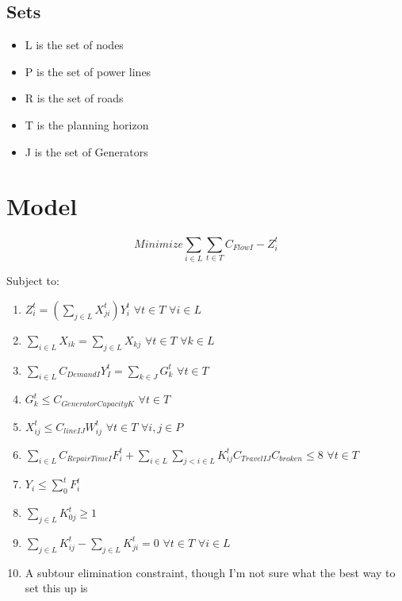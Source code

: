 \documentclass{article}
\begin{document}
\subsection{Sets}
\begin{itemize}
	\item L is the set of nodes
	\item P is the set of power lines
	\item R is the set of roads
	\item T is the planning horizon
	\item J is the set of Generators
\end{itemize}
	\section{Model}
	$$	Minimize \sum_{i \in L} \sum_{t \in T} C_{FlowI}-Z_{i}^t $$
	
	Subject to:
	\begin{enumerate}[label=(\arabic*), leftmargin=*, itemsep=0.4ex, before={\everymath{\displaystyle}}]%
		\item $Z_i^t = (\sum_{j \in L} X_{ji}^t) Y_i^t \hspace{4pt} \forall t \in T \hspace{4pt} \forall i \in L$
		\item $\sum_{i \in L} X_{ik} = \sum_{j \in L} X_{kj} \hspace{4pt} \forall t \in T \hspace{4pt} \forall k \in L$ 
		\item $\sum_{i \in L} C_{DemandI}Y_I^t = \sum_{k \in J} G_k^t \hspace{4pt} \forall t \in T$
		\item $G_k^t \leq C_{GeneratorCapacityK} \hspace{4pt} \forall t\in T$
		\item $X_{ij}^t \leq C_{lineIJ}W_{ij}^t \hspace{4pt} \forall t \in T \hspace{4pt} \forall i,j \in P$
		\item $\sum_{i \in L} C_{RepairTimeI} F_{i}^t + \sum_{i \in L} \sum_{j<i \in L}  K_{ij}^t C_{TravelIJ} C_{broken} \leq 8 \hspace{4pt} \forall t \in T \hspace{4pt}$
		\item $Y_i \leq \sum_{0}^{t} F_i^t$ 
		\item $\sum_{j \in L} K_{0j}^t \geq 1$
		\item $\sum_{j \in L}K_{ij}^t - \sum_{j \in L}K_{ji}^t = 0  \hspace{4pt} \forall t \in T \hspace{4pt} \forall i \in L$
		\item A subtour elimination constraint, though I'm not sure what the best way to set this up is 
	\end{enumerate}
\end{document}
